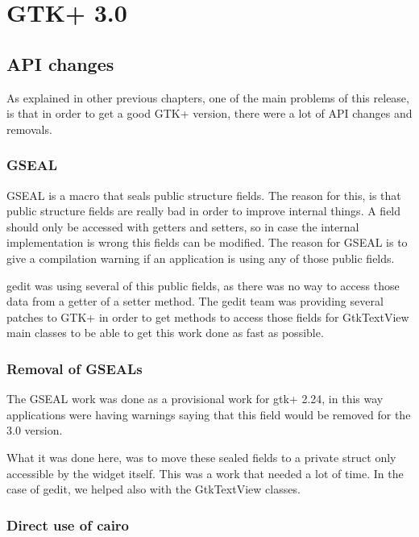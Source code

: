 
\chapter{GTK+ 3.0}


\section{API changes}

As explained in other previous chapters, one of the main problems of this release, is that in order to get a good GTK+ version, there were a lot of API changes and removals.

\subsection{GSEAL}

GSEAL is a macro that seals public structure fields. The reason for this, is that public structure fields are really bad in order to improve internal things. A field should only be accessed with getters and setters, so in case the internal implementation is wrong this fields can be modified. The reason for GSEAL is to give a compilation warning if an application is using any of those public fields.

gedit was using several of this public fields, as there was no way to access those data from a getter of a setter method. The gedit team was providing several patches to GTK+ in order to get methods to access those fields for GtkTextView main classes to be able to get this work done as fast as possible.

\subsection{Removal of GSEALs}

The GSEAL work was done as a provisional work for gtk+ 2.24, in this way applications were having warnings saying that this field would be removed for the 3.0 version.

What it was done here, was to move these sealed fields to a private struct only accessible by the widget itself. This was a work that needed a lot of time. In the case of gedit, we helped also with the GtkTextView classes.

\subsection{Direct use of cairo}

